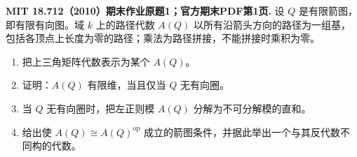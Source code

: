 \begin{exercise}\label{final:1}
\textbf{MIT 18.712（2010）期末作业原题1；官方期末PDF第1页.}
设 $Q$ 是有限箭图，即有限有向图。域 $k$ 上的路径代数 $A(Q)$ 以所有沿箭头方向的路径为一组基，包括各顶点上长度为零的路径；乘法为路径拼接，不能拼接时乘积为零。
\begin{enumerate}[label=(\roman*)]
\item 把上三角矩阵代数表示为某个 $A(Q)$。
\item 证明：$A(Q)$ 有限维，当且仅当 $Q$ 无有向圈。
\item 当 $Q$ 无有向圈时，把左正则模 $A(Q)$ 分解为不可分解模的直和。
\item 给出使 $A(Q)\cong A(Q)^{\mathrm{op}}$ 成立的箭图条件，并据此举出一个与其反代数不同构的代数。
\end{enumerate}
\end{exercise}
